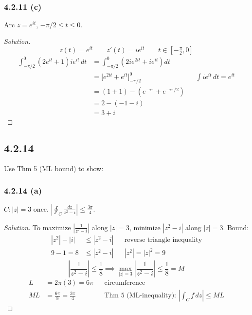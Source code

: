\documentclass{article}
\newenvironment{solution}{
\begin{proof}[Solution]}{
\end{proof}}
\begin{document}
\subsubsection*{4.2.11 (c)}
Arc $z = e^{it}$, $-\pi/2 \le t \le 0$.
\begin{solution}
  \[
    z(t) = e^{it} \qquad z'(t) = ie^{it} \qquad t \in \left[-\tfrac{\pi}{2}, 0\right]
  \]
  \begin{align*}
    \int_{-\pi/2}^{0} \left(2e^{it} + 1\right) ie^{it}\,dt
    & = \int_{-\pi/2}^{0} \left(2ie^{2it} + ie^{it}\right)dt \\
    & = \Big[e^{2it} + e^{it}\Big]_{-\pi/2}^{0}
      && \textstyle\int ie^{it}\,dt = e^{it} \\
    & = (1 + 1) - \left(e^{-i\pi} + e^{-i\pi/2}\right) \\
    & = 2 - (-1 - i) \\
    & = 3 + i
  \end{align*}
\end{solution}

\subsection*{4.2.14}
Use Thm 5 (ML bound) to show:

\subsubsection*{4.2.14 (a)}
$C: |z| = 3$ once. $\left|\oint_C \frac{dz}{z^2 - i}\right| \le \frac{3\pi}{4}$.
\begin{solution}
  To maximize $\left|\frac{1}{z^2-i}\right|$ along $|z|=3$, minimize $|z^2-i|$ along $|z|=3$.
  Bound:
  \begin{align*}
    |z^2| - |i| & \le |z^2 - i| && \text{reverse triangle inequality} \\
    9 - 1 = 8   & \le |z^2 - i| && |z^2| = |z|^2 = 9
  \end{align*}
  \[
    \left|\frac{1}{z^2-i}\right| \le \frac{1}{8}
    \implies \max_{|z|=3}\left|\frac{1}{z^2-i}\right| \le \frac{1}{8} = M
  \]
  \begin{align*}
    L  & = 2\pi(3) = 6\pi && \text{circumference} \\
    ML & = \frac{6\pi}{8} = \frac{3\pi}{4}
       && \text{Thm 5 (ML-inequality): } \left|\textstyle\int_C f\,dz\right| \le ML
  \end{align*}
\end{solution}
\end{document}
